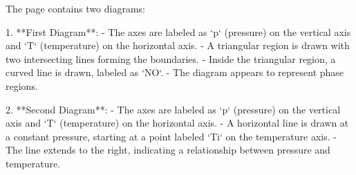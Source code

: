 The page contains two diagrams:

1. **First Diagram**:  
   - The axes are labeled as `p` (pressure) on the vertical axis and `T` (temperature) on the horizontal axis.  
   - A triangular region is drawn with two intersecting lines forming the boundaries.  
   - Inside the triangular region, a curved line is drawn, labeled as `NO`.  
   - The diagram appears to represent phase regions.

2. **Second Diagram**:  
   - The axes are labeled as `p` (pressure) on the vertical axis and `T` (temperature) on the horizontal axis.  
   - A horizontal line is drawn at a constant pressure, starting at a point labeled `Ti` on the temperature axis.  
   - The line extends to the right, indicating a relationship between pressure and temperature.